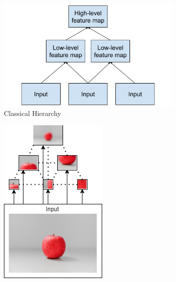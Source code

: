 \begin{figure}[H]
    \centering
    \begin{subfigure}[t]{0.55\textwidth}
        \centering
        \includegraphics[width=1\linewidth]{resources/related_works/hierarchy.png}
        \caption{Classical Hierarchy}
        \label{fig:my_label}
    \end{subfigure}
    \hfill
    \begin{subfigure}[t]{0.3\textwidth}
        \centering
        \includegraphics[width=1\linewidth]{resources/related_works/thousand_brains.png}

\end{subfigure}
\end{figure}
